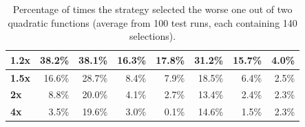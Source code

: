 \begin{table}[h!]
\begin{tabular}{|l|r|r|r|r|r|r|r|}
		\textbf{1.2x}                   & 38.2\%                                                                              & 38.1\%                                                                            & 16.3\%                                                                              & 17.8\%                                                                              & 31.2\%                                                                            & 15.7\%                                                                              & 4.0\%                               \\ \hline
		\textbf{1.5x}                   & 16.6\%                                                                              & 28.7\%                                                                            & 8.4\%                                                                               & 7.9\%                                                                               & 18.5\%                                                                            & 6.4\%                                                                               & 2.5\%                               \\ \hline
		\textbf{2x}                     & 8.8\%                                                                               & 20.0\%                                                                            & 4.1\%                                                                               & 2.7\%                                                                               & 13.4\%                                                                            & 2.4\%                                                                               & 2.3\%                               \\ \hline
		\textbf{4x}                     & 3.5\%                                                                               & 19.6\%                                                                            & 3.0\%                                                                               & 0.1\%                                                                               & 14.6\%                                                                            & 1.5\%                                                                               & 2.3\%                               \\ \hline
	\end{tabular}
	\egroup
	\caption{Percentage of times the strategy selected the worse one out of two quadratic functions (average from 100 test runs, each containing 140 selections).}
	\label{tab:strategy_comparison_quadratic}
\end{table}

